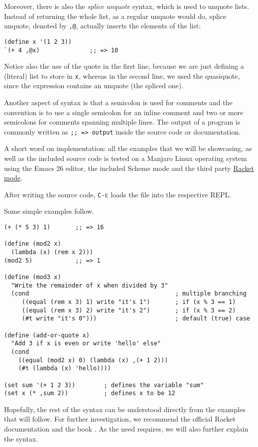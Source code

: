 Moreover, there is also the \emph{splice unquote} syntax, which
is used to unquote lists. Instead of returning the whole list,
as a regular unquote would do, splice unquote, denoted by
\texttt{,{@}}, actually inserts the elements of the list:
{
  \small
\begin{verbatim}
(define x '(1 2 3))
`(+ 4 ,@x)              ;; => 10
\end{verbatim}
}
Notice also the use of the quote in the first line, because we
are just defining a (literal) list to store in \texttt{x}, whereas
in the second line, we used the quasiquote, since the expression
contains an unquote (the spliced one).

Another aspect of syntax is that a semicolon is used for comments and
the convention is to use a single semicolon for an inline comment
and two or more semicolons for comments spanning multiple lines.
The output of a program is commonly written as \texttt{;; => output}
inside the source code or documentation.

\begin{remark}\label{rk:implementation}
  A short word on implementation: all the examples that we will be
  showcasing, as well as the included source code is tested on a
  Manjaro Linux operating system using the Emacs 26 editor, the
  included Scheme mode and the third party
  \href{https://www.racket-mode.com/}{Racket mode}.

  After writing the source code, \texttt{C-c} loads the file into
  the respective REPL.
\end{remark}

Some simple examples follow.
{
  \small
\begin{verbatim}
(+ (* 5 3) 1)       ;; => 16

(define (mod2 x)
  (lambda (x) (rem x 2)))
(mod2 5)            ;; => 1

(define (mod3 x)
  "Write the remainder of x when divided by 3"
  (cond                                         ; multiple branching
     ((equal (rem x 3) 1) write "it's 1")       ; if (x % 3 == 1)
     ((equal (rem x 3) 2) write "it's 2")       ; if (x % 3 == 2)
     (#t write "it's 0")))                      ; default (true) case

(define (add-or-quote x)
  "Add 3 if x is even or write 'hello' else"
  (cond
    ((equal (mod2 x) 0) (lambda (x) ,(+ 1 2)))
    (#t (lambda (x) 'hello))))

(set sum '(+ 1 2 3))        ; defines the variable "sum"
(set x (* ,sum 2))          ; defines x to be 12
\end{verbatim}
}

\vspace{0.3cm}

Hopefully, the rest of the syntax can be understood directly from
the examples that will follow. For further investigation, we recommend
the official Racket documentation \cite{racket} and the book
\cite{htdp}. As the need requires, we will also further explain the syntax.

